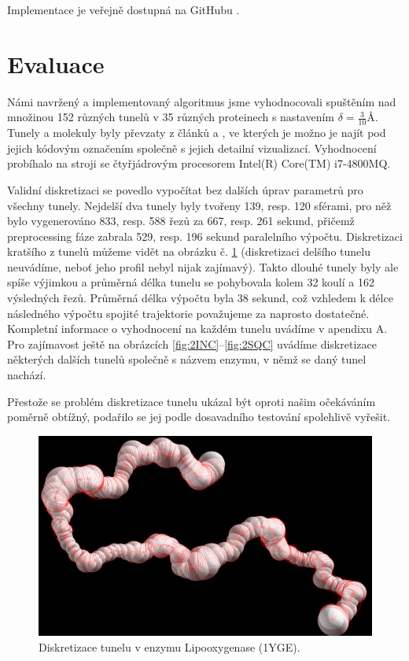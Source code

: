 Implementace je veřejně dostupná na GitHubu \cite{discretizer}.





\section{Evaluace} \label{subsec:evaluation}
Námi navržený a implementovaný algoritmus jsme vyhodnocovali spuštěním nad
množinou 152 různých tunelů v 35 různých proteinech s nastavením $ \delta = \frac{3}{10} Å $.
Tunely a molekuly byly převzaty z článků \cite{Enzymes} a \cite{Caver}, ve
kterých je možno
je najít pod jejich kódovým označením společně s jejich detailní vizualizací.
Vyhodnocení probíhalo na stroji se čtyřjádrovým procesorem Intel(R) Core(TM) i7-4800MQ.

Validní diskretizaci se povedlo vypočítat bez dalších úprav parametrů pro všechny
tunely. Nejdelší dva tunely byly tvořeny 139, resp. 120 sférami, pro něž bylo
vygenerováno 833, resp. 588 řezů za 667, resp. 261 sekund, přičemž preprocessing
fáze zabrala 529, resp. 196 sekund paralelního výpočtu. Diskretizaci kratšího
z tunelů můžeme vidět na obrázku č. \ref{fig:1YGE} (diskretizaci delšího tunelu
neuvádíme, neboť jeho profil nebyl nijak zajímavý). Takto dlouhé tunely byly ale
spíše výjimkou a průměrná délka tunelu se pohybovala kolem 32 koulí a 162
výsledných řezů. Průměrná délka výpočtu byla 38 sekund, což vzhledem k délce
následného výpočtu spojité trajektorie považujeme za naprosto dostatečné.
Kompletní informace o vyhodnocení na každém tunelu uvádíme v apendixu A.
Pro zajímavost ještě na obrázcích \ref{fig:2INC}–\ref{fig:2SQC} uvádíme
diskretizace některých dalších tunelů společně s názvem enzymu, v němž se daný
tunel nachází.

Přestože se problém diskretizace tunelu ukázal být oproti našim očekáváním
poměrně obtížný, podařilo se jej podle dosavadního testování spolehlivě vyřešit.

\begin{figure}[ht]
    \centering
    \includegraphics[width=.75\textwidth]{img/1YGE.png}
    \caption{Diskretizace tunelu v enzymu Lipooxygenase (1YGE).}
  \centering
  \label{fig:1YGE}
\end{figure}

